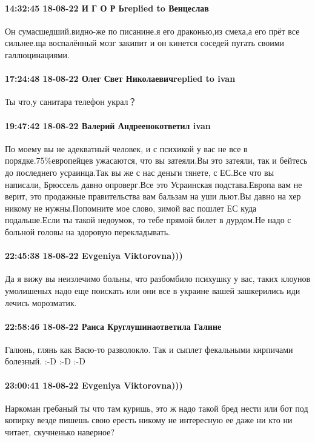  
 
 
 
 

\paragraph{14:32:45 18-08-22 И Г О Р Ьreplied to Венцеслав}

Он сумасшедший.видно-же по писанине.я его драконью,из смеха,а его прёт все
сильнее.ща воспалённый мозг закипит и он кинется соседей пугать своими
галлюцинациями.

\paragraph{17:24:48 18-08-22 Олег Свет Николаевичreplied to ivan}

Ты что,у санитара телефон украл？

\paragraph{19:47:42 18-08-22 Валерий Андреенокответил ivan}

По моему вы не адекватный человек, и с психикой у вас не все в
порядке.75\%европейцев ужасаются, что вы затеяли.Вы это затеяли, так и бейтесь
до последнего усраинца.Так вы же с нас деньги тянете, с ЕС.Все что вы написали,
Брюссель давно опроверг.Все это Усраинская подстава.Европа вам не верит, это
продажные правительства вам бальзам на уши льют.Вы давно на хер никому не
нужны.Попомните мое слово, зимой вас пошлет ЕС куда подальше.Если ты такой
недоумок, то тебе прямой билет в дурдом.Не надо с больной головы на здоровую
перекладывать.

\paragraph{22:45:38 18-08-22 Evgeniya Viktorovna)))}

Да я вижу вы неизлечимо больны, что разбомбило психушку у вас, таких клоунов
умолишеных надо еще поискать или они все в украине вашей зашкерились иди лечись
морозматик.

\paragraph{22:58:46 18-08-22 Раиса Круглушинаответила Галине}

Галюнь, глянь как Васю-то разволокло. Так и сыплет фекальными кирпичами
болезный. :-D :-D :-D

\paragraph{23:00:41 18-08-22 Evgeniya Viktorovna)))}

Наркоман гребаный ты что там куришь, это ж надо такой бред нести или бот под
копирку везде пишешь свою ересть никому не интересную ее даже ни кто ни читает,
скучненько наверное?
